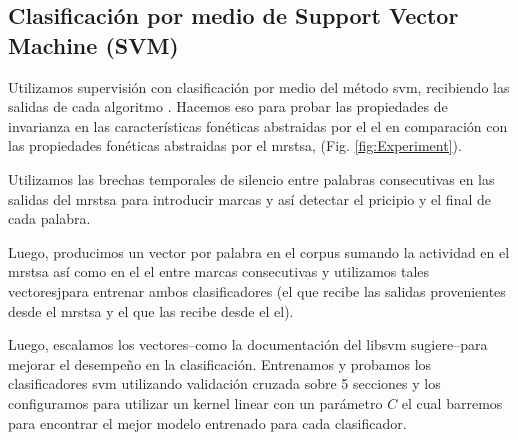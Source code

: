 








\subsection{Clasificación por medio de Support Vector Machine (SVM)}

Utilizamos supervisión con clasificación por medio del método \gls{svm}, recibiendo las salidas de cada algoritmo \cite{CC01a, libsvm}. Hacemos eso para probar las propiedades de invarianza en las características fonéticas abstraidas por el \gls{el} en comparación con las propiedades fonéticas abstraidas por el \gls{mrstsa}, 
(Fig. \ref{fig:Experiment}).

Utilizamos las brechas temporales de silencio entre palabras consecutivas en las salidas del \gls{mrstsa} para introducir marcas y así detectar el pricipio y el final de cada palabra.

Luego, producimos un vector por palabra en el corpus sumando la actividad en el \gls{mrstsa} así como en el \gls{el} entre marcas consecutivas
y utilizamos tales vectoresjpara entrenar ambos clasificadores (el que recibe las salidas provenientes desde el \gls{mrstsa} y el que las recibe desde el \gls{el}).

Luego, escalamos los vectores--como la documentación del \gls{libsvm} sugiere--para mejorar el desempeño en la clasificación.
Entrenamos y probamos los clasificadores \gls{svm} utilizando validación cruzada sobre 5 secciones y los configuramos para utilizar un kernel linear con un parámetro $C$ el cual barremos para encontrar el mejor modelo entrenado para cada clasificador.




